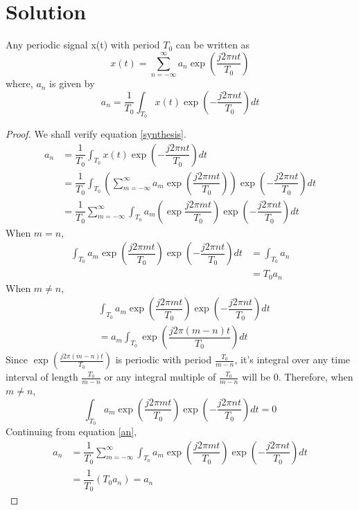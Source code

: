 \documentclass[journal,12pt,twocolumn]{IEEEtran}
\begin{document}
\section{Solution}
\begin{lemma}
Any periodic signal x(t) with period $T_0$ can be written as 
\begin{equation}
    x(t) = \sum_{n=-\infty}^{\infty} a_n \exp \left(\dfrac{j2\pi nt}{T_0}\right)\label{analysis}
\end{equation}
where, $a_n$ is given by
\begin{equation}
    a_n = \dfrac{1}{T_0}\int_{T_0}x(t)\exp\left(-\dfrac{j2\pi nt}{T_0}\right)dt\label{synthesis}
\end{equation}
\end{lemma}
\begin{proof}
We shall verify equation \ref{synthesis}. 
\begin{align}
    a_n &= \dfrac{1}{T_0}\int_{T_0}x(t)\exp\left(-\dfrac{j2\pi nt}{T_0}\right)dt\\
        &= \dfrac{1}{T_0}\int_{T_0}\left(\sum_{m=-\infty}^{\infty} a_m \exp \left(\dfrac{j2\pi mt}{T_0}\right)\right)\exp\left(-\dfrac{j2\pi nt}{T_0}\right)dt\\
        &= \dfrac{1}{T_0}\sum_{m=-\infty}^{\infty}\int_{T_0}a_m \left(\exp \dfrac{j2\pi mt}{T_0}\right)\exp\left(-\dfrac{j2\pi nt}{T_0}\right)dt\label{an}
\end{align}
When $m = n$,
\begin{align}
    \int_{T_0}a_m \exp \left(\dfrac{j2\pi mt}{T_0}\right)\exp\left(-\dfrac{j2\pi nt}{T_0}\right)dt &= \int_{T_0} a_n\\
    &= T_0 a_n
\end{align}
When $m \ne n$,
\begin{align}
    &\int_{T_0}a_m \exp \left(\dfrac{j2\pi mt}{T_0}\right)\exp\left(-\dfrac{j2\pi nt}{T_0}\right)dt\\ 
    &= a_m\int_{T_0}\exp \left(\dfrac{j2\pi (m-n)t}{T_0}\right) dt
\end{align}
Since $\exp \left(\frac{j2\pi (m-n)t}{T_0}\right)$ is periodic with period $\frac{T_0}{m-n}$, it's integral over any time interval of length $\frac{T_0}{m-n}$ or any integral multiple of $\frac{T_0}{m-n}$ will be 0. Therefore, when $m \ne n$,
\begin{equation}
    \int_{T_0}a_m \exp \left(\dfrac{j2\pi mt}{T_0}\right)\exp\left(-\dfrac{j2\pi nt}{T_0}\right)dt = 0
\end{equation}
Continuing from equation \ref{an},
\begin{align}
    a_n &=  \dfrac{1}{T_0}\sum_{m=-\infty}^{\infty}\int_{T_0}a_m \exp \left(\dfrac{j2\pi mt}{T_0}\right)\exp\left(-\dfrac{j2\pi nt}{T_0}\right)dt\\
    &= \dfrac{1}{T_0}(T_0a_n) = a_n
\end{align}
\end{proof}
\end{document}
